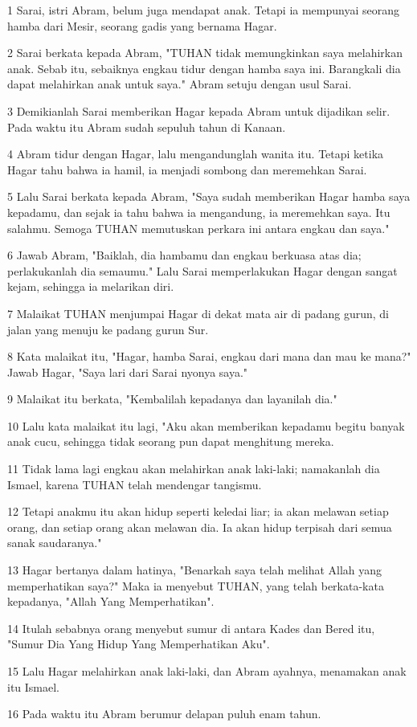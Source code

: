 \par 1 Sarai, istri Abram, belum juga mendapat anak. Tetapi ia mempunyai seorang hamba dari Mesir, seorang gadis yang bernama Hagar.
\par 2 Sarai berkata kepada Abram, "TUHAN tidak memungkinkan saya melahirkan anak. Sebab itu, sebaiknya engkau tidur dengan hamba saya ini. Barangkali dia dapat melahirkan anak untuk saya." Abram setuju dengan usul Sarai.
\par 3 Demikianlah Sarai memberikan Hagar kepada Abram untuk dijadikan selir. Pada waktu itu Abram sudah sepuluh tahun di Kanaan.
\par 4 Abram tidur dengan Hagar, lalu mengandunglah wanita itu. Tetapi ketika Hagar tahu bahwa ia hamil, ia menjadi sombong dan meremehkan Sarai.
\par 5 Lalu Sarai berkata kepada Abram, "Saya sudah memberikan Hagar hamba saya kepadamu, dan sejak ia tahu bahwa ia mengandung, ia meremehkan saya. Itu salahmu. Semoga TUHAN memutuskan perkara ini antara engkau dan saya."
\par 6 Jawab Abram, "Baiklah, dia hambamu dan engkau berkuasa atas dia; perlakukanlah dia semaumu." Lalu Sarai memperlakukan Hagar dengan sangat kejam, sehingga ia melarikan diri.
\par 7 Malaikat TUHAN menjumpai Hagar di dekat mata air di padang gurun, di jalan yang menuju ke padang gurun Sur.
\par 8 Kata malaikat itu, "Hagar, hamba Sarai, engkau dari mana dan mau ke mana?" Jawab Hagar, "Saya lari dari Sarai nyonya saya."
\par 9 Malaikat itu berkata, "Kembalilah kepadanya dan layanilah dia."
\par 10 Lalu kata malaikat itu lagi, "Aku akan memberikan kepadamu begitu banyak anak cucu, sehingga tidak seorang pun dapat menghitung mereka.
\par 11 Tidak lama lagi engkau akan melahirkan anak laki-laki; namakanlah dia Ismael, karena TUHAN telah mendengar tangismu.
\par 12 Tetapi anakmu itu akan hidup seperti keledai liar; ia akan melawan setiap orang, dan setiap orang akan melawan dia. Ia akan hidup terpisah dari semua sanak saudaranya."
\par 13 Hagar bertanya dalam hatinya, "Benarkah saya telah melihat Allah yang memperhatikan saya?" Maka ia menyebut TUHAN, yang telah berkata-kata kepadanya, "Allah Yang Memperhatikan".
\par 14 Itulah sebabnya orang menyebut sumur di antara Kades dan Bered itu, "Sumur Dia Yang Hidup Yang Memperhatikan Aku".
\par 15 Lalu Hagar melahirkan anak laki-laki, dan Abram ayahnya, menamakan anak itu Ismael.
\par 16 Pada waktu itu Abram berumur delapan puluh enam tahun.

